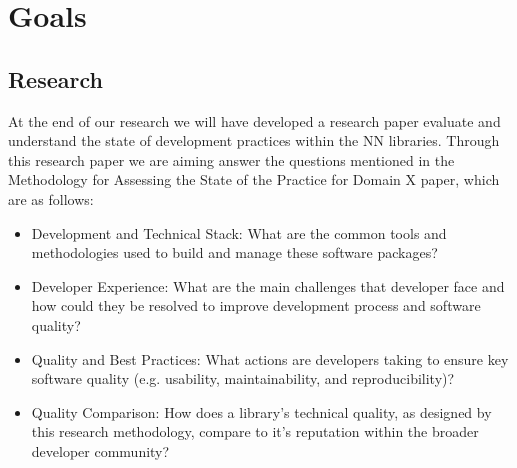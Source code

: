 \documentclass{article}
\begin{document}
\section{Goals}
\subsection{Research}
At the end of our research we will have developed a research paper evaluate and understand the state of development practices within the NN libraries. Through this research paper we are aiming answer the questions mentioned in the Methodology for Assessing the State of the Practice for Domain X paper, which are as follows:
\begin{itemize}
    \item Development and Technical Stack: What are the common tools and methodologies used to build and manage these software packages?
    \item Developer Experience: What are the main challenges that developer face and how could they be resolved to improve development process and software quality?
    \item Quality and Best Practices: What actions are developers taking to ensure key software quality (e.g. usability, maintainability, and reproducibility)?
    \item Quality Comparison: How does a library's technical quality, as designed by this research methodology, compare to it's reputation within the broader developer community?
\end{itemize}
\end{document}
